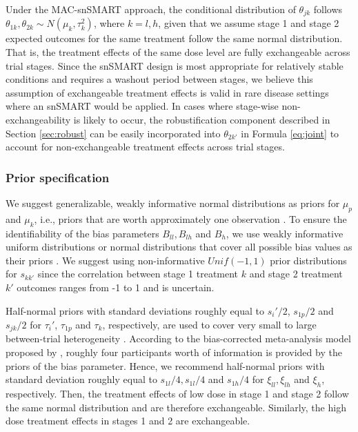 Under the MAC-snSMART approach, the conditional distribution of $\theta_{jk}$ follows $\theta_{1k},\theta_{2k} \sim N(\mu_k, \tau_k^2)$, where $k = l, h$,
given that we assume stage 1 and stage 2 expected outcomes for the same treatment follow the same normal distribution. That is, the treatment effects of the same dose level are fully exchangeable across trial stages. Since the \ac{snSMART} design is most appropriate for relatively stable conditions and requires a washout period between stages, we believe this assumption of exchangeable treatment effects is valid in rare disease settings where an \ac{snSMART} would be applied. In cases where stage-wise non-exchangeability is likely to occur, the robustification component described in Section \ref{sec:robust} can be easily incorporated into $\theta_{2k'}$ in Formula \ref{eq:joint} to account for non-exchangeable treatment effects across trial stages. 

\subsubsection{Prior specification} \label{sec:priors}
We suggest generalizable, weakly informative normal distributions as priors for $\mu_p$ and $\mu_{k}$, i.e., priors that are worth approximately one observation \citep{kass1995reference}. To ensure the identifiability of the bias parameters $B_{ll}, B_{lh}$ and $B_h$, we use weakly informative uniform distributions or normal distributions that cover all possible bias values as their priors \citep{verde2021bias}. We suggest using non-informative $Unif(-1,1)$ prior distributions for $s_{kk'}$ since the correlation between stage 1 treatment $k$ and stage 2 treatment $k'$ outcomes ranges from -1 to 1 and is uncertain.

Half-normal priors with standard deviations roughly equal to $s_i'/2$, $s_{1p}/2$ and $s_{jk}/2$ for $\tau_i'$, $\tau_{1p}$ and $\tau_k$, respectively, are used to cover very small to large between-trial heterogeneity \citep{spiegelhalter2004bayesian}. According to the bias-corrected meta-analysis model proposed by \cite{verde2021bias}, roughly four participants worth of information is provided by the priors of the bias parameter. Hence, we recommend half-normal priors with standard deviation roughly equal to $s_{1l}/4, s_{1l}/4$ and $s_{1h}/4$ for $\xi_{ll}, \xi_{lh}$ and $\xi_h$, respectively. Then, the treatment effects of low dose in stage 1 and stage 2 follow the same normal distribution and are therefore exchangeable. Similarly, the high dose treatment effects in stages 1 and 2 are exchangeable.

